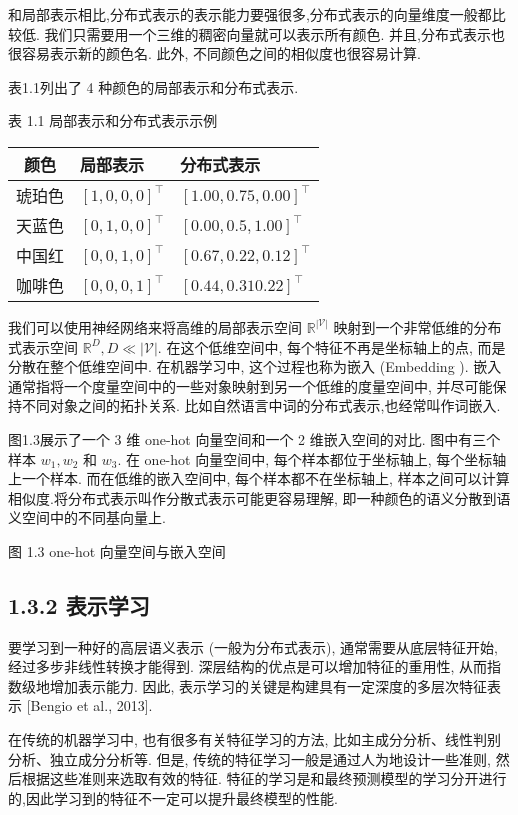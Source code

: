 \documentclass[10pt]{article}
\begin{document}
和局部表示相比,分布式表示的表示能力要强很多,分布式表示的向量维度一般都比较低. 我们只需要用一个三维的稠密向量就可以表示所有颜色. 并且,分布式表示也很容易表示新的颜色名. 此外, 不同颜色之间的相似度也很容易计算.

表1.1列出了 4 种颜色的局部表示和分布式表示.

表 1.1 局部表示和分布式表示示例

\begin{center}
\begin{tabular}{cll}
\hline
颜色 & 局部表示 & 分布式表示 \\
\hline
琥珀色 & $[1,0,0,0]^{\top}$ & $[1.00,0.75,0.00]^{\top}$ \\
天蓝色 & $[0,1,0,0]^{\top}$ & $[0.00,0.5,1.00]^{\top}$ \\
中国红 & $[0,0,1,0]^{\top}$ & $[0.67,0.22,0.12]^{\top}$ \\
咖啡色 & $[0,0,0,1]^{\top}$ & $[0.44,0.310 .22]^{\top}$ \\
\hline
\end{tabular}
\end{center}

我们可以使用神经网络来将高维的局部表示空间 $\mathbb{R}^{|\mathcal{V}|}$ 映射到一个非常低维的分布式表示空间 $\mathbb{R}^{D}, D \ll|\mathcal{V}|$. 在这个低维空间中, 每个特征不再是坐标轴上的点, 而是分散在整个低维空间中. 在机器学习中, 这个过程也称为嵌入 (Embedding ). 嵌入通常指将一个度量空间中的一些对象映射到另一个低维的度量空间中, 并尽可能保持不同对象之间的拓扑关系. 比如自然语言中词的分布式表示,也经常叫作词嵌入.

图1.3展示了一个 3 维 one-hot 向量空间和一个 2 维嵌入空间的对比. 图中有三个样本 $w_{1}, w_{2}$ 和 $w_{3}$. 在 one-hot 向量空间中, 每个样本都位于坐标轴上, 每个坐标轴上一个样本. 而在低维的嵌入空间中, 每个样本都不在坐标轴上, 样本之间可以计算相似度.将分布式表示叫作分散式表示可能更容易理解, 即一种颜色的语义分散到语义空间中的不同基向量上.



图 1.3 one-hot 向量空间与嵌入空间

\subsection*{1.3.2 表示学习}
要学习到一种好的高层语义表示 (一般为分布式表示), 通常需要从底层特征开始, 经过多步非线性转换才能得到. 深层结构的优点是可以增加特征的重用性, 从而指数级地增加表示能力. 因此, 表示学习的关键是构建具有一定深度的多层次特征表示 [Bengio et al., 2013].

在传统的机器学习中, 也有很多有关特征学习的方法, 比如主成分分析、线性判别分析、独立成分分析等. 但是, 传统的特征学习一般是通过人为地设计一些准则, 然后根据这些准则来选取有效的特征. 特征的学习是和最终预测模型的学习分开进行的,因此学习到的特征不一定可以提升最终模型的性能.
\end{document}
